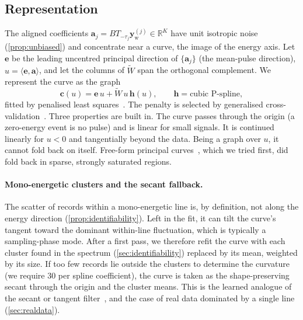 \documentclass[aps,prapplied,reprint,superscriptaddress,longbibliography,nofootinbib]{revtex4-2}
\theoremstyle{remark}
\newcommand{\R}{\mathbb{R}}
\newcommand{\vect}[1]{\bm{#1}}
\newcommand{\Sh}[1]{T_{#1}}
\newcommand{\yw}{\vect{y}_{\mathrm w}}
\begin{document}
\subsection{Representation}
The aligned coefficients $\vect a_j=B\Sh{-\tau_j}\yw^{(j)}\in\R^K$ have unit
isotropic noise (\cref{prop:unbiased}) and concentrate near a curve, the image of
the energy axis. Let $\vect e$ be the leading uncentred principal direction of
$\{\vect a_j\}$ (the mean-pulse direction), $u=\langle\vect e,\vect a\rangle$, and
let the columns of $\tilde W$ span the orthogonal complement. We represent the
curve as the graph
\begin{equation}
\vect c(u)=\vect e\,u+\tilde W\,u\,\vect h(u),\qquad \vect h=\text{cubic P-spline},
\end{equation}
fitted by penalised least squares~\cite{EilersMarx1996}. The penalty is selected by
generalised cross-validation~\cite{CravenWahba1979}. Three properties are built in.
The curve passes through the origin (a zero-energy event is no pulse) and is linear
for small signals. It is continued linearly for $u<0$ and tangentially beyond the
data. Being a graph over $u$, it cannot fold back on itself. Free-form principal
curves~\cite{HastieStuetzle1989}, which we tried first, did fold back in sparse,
strongly saturated regions.

\paragraph{Mono-energetic clusters and the secant fallback.} The scatter of records
within a mono-energetic line is, by definition, not along the energy direction
(\cref{prop:identifiability}). Left in the fit, it can tilt the curve's tangent
toward the dominant within-line fluctuation, which is typically a sampling-phase
mode. After a first pass, we therefore refit the curve with each cluster found in
the spectrum (\cref{sec:identifiability}) replaced by its mean, weighted by its
size. If too few records lie outside the clusters to determine the curvature (we
require 30 per spline coefficient), the curve is taken as the shape-preserving
secant through the origin and the cluster means. This is the learned analogue of
the secant or tangent filter~\cite{Fowler2017tangent}, and the case of real data
dominated by a single line (\cref{sec:realdata}).
\end{document}
